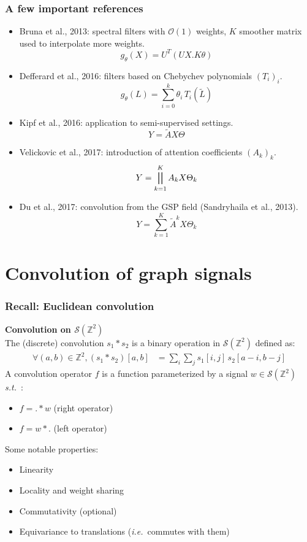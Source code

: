 \documentclass[t,9pt,pdftex]{beamer}
\theoremstyle{definition}
\newcommand{\bbz}{\mathbb{Z}}
\newcommand{\cs}{\mathcal{S}}
\newcommand{\ie}{\emph{i.e.}~}
\newcommand{\st}{\emph{s.t.}~}
\newcommand{\h}[1]{\hspace{#1pt}}
\begin{document}
\begin{frame}[c, label=current]
  \frametitle{A few important references}
  \begin{itemize}
    \item Bruna et al., 2013: spectral filters with $\mathcal{O}(1)$ weights, $K$ smoother matrix used to interpolate more weights.
    $$
    g_\theta(X) = U^T(UX . K\theta)
    $$
    \item Defferard et al., 2016: filters based on Chebychev polynomials $(T_i)_i$.
    $$
    g_\theta(L) = \sum_{i=0}^k \theta_i \h{2} T_i(\widetilde{L})
    $$
    \item Kipf et al., 2016: application to semi-supervised settings.
    $$
    Y = \widetilde{A} X \Theta \label{eq:gcn}
    $$
    \item Velickovic et al., 2017: introduction of attention coefficients $(A_k)_k$.
    $$
    Y = \displaystyle\bigparallel_{k=1}^K A_k X \Theta_k
    $$
    \item Du et al., 2017: convolution from  the GSP field (Sandryhaila et al., 2013).
    $$
    Y = \sum_{k=1}^K \widetilde{A}^k X \Theta_k
    $$
  \end{itemize}
\end{frame}


\section{Convolution of graph signals}


\begin{frame}[c, label=current]
  \frametitle{Recall: Euclidean convolution}
  \begin{definition}\textbf{Convolution on $\cs(\bbz^2)$}\\
  The (discrete) convolution $s_1 \ast s_2$ is a binary operation in $\cs(\bbz^2)$ defined as:
  \begin{align*}
  \forall (a,b) \in \bbz^2, (s_1 \ast s_2) [a,b] & = \displaystyle \sum_i \sum_j s_1[i,j] \h{2} s_2[a-i, b-j]
  \end{align*}
  A convolution operator $f$ is a function parameterized by a signal $w \in \cs(\bbz^2)$ \st:
    \begin{itemize}
      \item $f = . \ast w$ (right operator)
      \item $f = w \ast .$ (left operator)
    \end{itemize}
  \label{def:conv}
  \end{definition}

Some notable properties:
  \begin{itemize}
    \item Linearity
    \item Locality and weight sharing
    \item Commutativity (optional)
    \item Equivariance to translations (\ie commutes with them)
  \end{itemize}
\end{frame}
\end{document}
